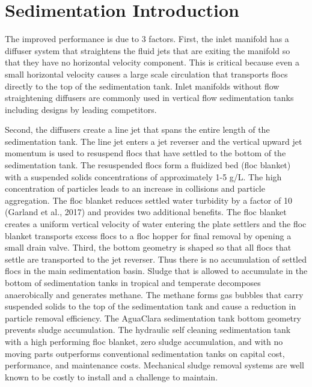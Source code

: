 \documentclass[letterpaper,10pt,english]{sphinxmanual}
\begin{document}
{\chapter{Sedimentation Introduction}
\label{\detokenize{Sedimentation/Sed_Intro:sedimentation-introduction}}\label{\detokenize{Sedimentation/Sed_Intro:sedimentation-intro}}\label{\detokenize{Sedimentation/Sed_Intro::doc}}
The improved performance is due to 3 factors. First, the inlet manifold has a diffuser system that straightens the fluid jets that are exiting the manifold so that they have no horizontal velocity component. This is critical because even a small horizontal velocity causes a large scale circulation that transports flocs directly to the top of the sedimentation tank. Inlet manifolds without flow straightening diffusers are commonly used in vertical flow sedimentation tanks including designs by leading competitors.

Second, the diffusers create a line jet that spans the entire length of the sedimentation tank. The line jet enters a jet reverser and the vertical upward jet momentum is used to resuspend flocs that have settled to the bottom of the sedimentation tank. The resuspended flocs form a fluidized bed (floc blanket) with a suspended solids concentrations of approximately 1-5 g/L. The high concentration of particles leads to an increase in collisions and particle aggregation. The floc blanket reduces settled water turbidity by a factor of 10 (Garland et al., 2017) and provides two additional benefits. The floc blanket creates a uniform vertical velocity of water entering the plate settlers and the floc blanket transports excess flocs to a floc hopper for final removal by opening a small drain valve.
Third, the bottom geometry is shaped so that all flocs that settle are transported to the jet reverser. Thus there is no accumulation of settled flocs in the main sedimentation basin. Sludge that is allowed to accumulate in the bottom of sedimentation tanks in tropical and temperate decomposes anaerobically and generates methane. The methane forms gas bubbles that carry suspended solids to the top of the sedimentation tank and cause a reduction in particle removal efficiency.  The AguaClara sedimentation tank bottom geometry prevents sludge accumulation.
The hydraulic self cleaning sedimentation tank with a high performing floc blanket, zero sludge accumulation, and with no moving parts outperforms conventional sedimentation tanks on capital cost, performance, and maintenance costs. Mechanical sludge removal systems are well known to be costly to install and a challenge to maintain.


}
\end{document}
